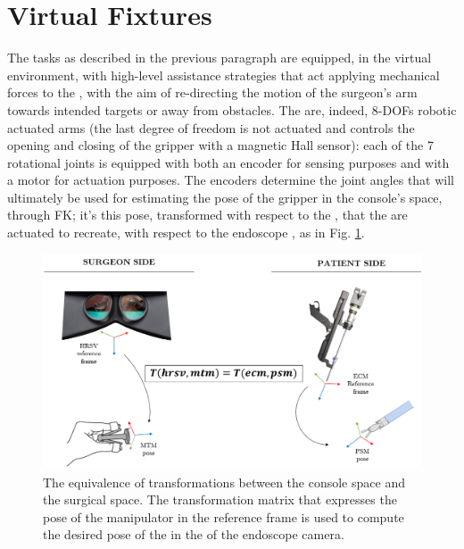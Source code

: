 \documentclass[../main.tex]{subfiles}
\begin{document}
\section{Virtual Fixtures}
The tasks as described in the previous paragraph are equipped, in the virtual environment, with high-level assistance strategies that act applying mechanical forces to the \mtms, with the aim of re-directing the motion of the surgeon's arm towards intended targets or away from obstacles. The \mtms are, indeed, 8-DOFs robotic actuated arms (the last degree of freedom is not actuated and controls the opening and closing of the gripper with a magnetic Hall sensor): each of the 7 rotational joints is equipped with both an encoder for sensing purposes and with a motor for actuation purposes. The encoders determine the joint angles that will ultimately be used for estimating the pose of the gripper in the console's space, through FK; it's this pose, transformed with respect to the \hrsv \rf, that the \psms are actuated to recreate, with respect to the endoscope \rf, as in Fig. \ref{fig:consoletocarttransform}. 

\begin{figure}[h]
    \centering
    \includegraphics[width=\textwidth]{images/console_to_cart_transform.png}
    \caption{The equivalence of transformations between the console space and the surgical space. The transformation matrix that expresses the pose of the manipulator in the \hrsv reference frame is used to compute the desired pose of the \psm in the \rf of the endoscope camera.}
    \label{fig:consoletocarttransform}
\end{figure}
\end{document}
